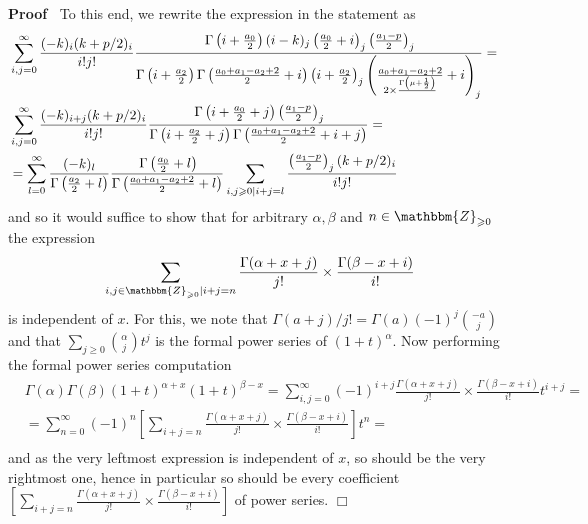 \documentclass{article}
\renewenvironment{proof}{\noindent\textbf{Proof\ }}{\hspace*{\fill}$\Box$\medskip}
\theoremstyle{remark}
\begin{document}
\begin{proof}
  To this end, we rewrite the expression in the statement as
  \begin{eqnarray}
    & \sum_{i, j = 0}^{\infty} \frac{(- k)_i (k + p / 2)_i}{i!j!}
    \frac{\hspace{0.17em} \Gamma \left( i + \frac{a_0}{2} \right) (i - k)_j
    \left( \frac{a_0}{2} + i \right)_j \left( \frac{a_1 - p}{2}
    \right)_j}{\Gamma \left( i + \frac{a_2}{2} \right) \Gamma \left( \frac{a_0
    + a_1 - a_2 + 2}{2} + i \right) \left( i + \frac{a_2}{2} \right)_j \left(
    \frac{a_0 + a_1 - a_2 + 2}{2 \times \frac{\Gamma \left( \mu + \frac{1}{2}
    \right)}{}} + i \right)_j} = &  \nonumber\\
    & \sum_{i, j = 0}^{\infty} \frac{(- k)_{i + j} (k + p / 2)_i}{i!j!}
    \frac{\hspace{0.17em} \Gamma \left( i + \frac{a_0}{2} + j \right) \left(
    \frac{a_1 - p}{2} \right)_j}{\Gamma \left( i + \frac{a_2}{2} + j \right)
    \Gamma \left( \frac{a_0 + a_1 - a_2 + 2}{2} + i + j \right)} = & 
    \nonumber\\
    & = \sum_{l = 0}^{\infty} \frac{(- k)_l}{\Gamma \left( \frac{a_2}{2} + l
    \right) } \frac{\hspace{0.17em} \Gamma \left( \frac{a_0}{2} + l
    \right)}{\Gamma \left( \frac{a_0 + a_1 - a_2 + 2}{2} + l \right)} \sum_{i,
    j \geqslant 0 \mid i + j = l} \frac{\left( \frac{a_1 - p}{2} \right)_j
    (k + p / 2)_i}{i!j!} &  \nonumber
  \end{eqnarray}
  and so it would suffice to show that for arbitrary $\alpha, \beta$ and $n
  \in \mathbbm{Z}_{\geqslant 0}$ the expression
  \[ \sum_{i, j \in \mathbbm{Z}_{\geqslant 0} \mid i + j = n} \frac{\Gamma
     (\alpha + x + j)}{j!} \times \frac{\Gamma (\beta - x + i)}{i!} \]
  is independent of $x$. For this, we note that $\Gamma (a + j) / j! = \Gamma
  (a) (- 1)^j \binom{- a}{j}$ and that $\sum_{j \geqslant 0} \binom{\alpha}{j}
  t^j$ is the formal power series of $(1 + t)^{\alpha}$. Now performing the
  formal power series computation
  \begin{eqnarray}
    & \Gamma (\alpha) \Gamma (\beta) (1 + t)^{\alpha + x} (1 + t)^{\beta - x}
    = \sum_{i, j = 0}^{\infty} (- 1)^{i + j} \frac{\Gamma (\alpha + x +
    j)}{j!} \times \frac{\Gamma (\beta - x + i)}{i!} t^{i + j} = & 
    \nonumber\\
    & = \sum_{n = 0}^{\infty} (- 1)^n \left[ \sum_{i + j = n} \frac{\Gamma
    (\alpha + x + j)}{j!} \times \frac{\Gamma (\beta - x + i)}{i!}  \right]
    t^n = &  \nonumber\\
    &  &  \nonumber
  \end{eqnarray}
  and as the very leftmost expression is independent of $x$, so should be the
  very rightmost one, hence in particular so should be every coefficient
  $\left[ \sum_{i + j = n} \frac{\Gamma (\alpha + x + j)}{j!} \times
  \frac{\Gamma (\beta - x + i)}{i!}  \right]$ of power series.
\end{proof}
\end{document}
